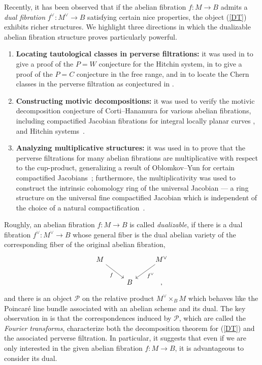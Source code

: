 \documentclass[11pt]{amsart}
\theoremstyle{plain}
\theoremstyle{definition}
\theoremstyle{remark}
\newcommand{\CP}{{\mathcal P}}
\begin{document}
Recently, it has been observed that if the abelian fibration $f: M \to B$ admits a \emph{dual fibration} $f^\vee: M^\vee \to B$ satisfying certain nice properties, the object (\ref{DT}) exhibits richer structures. We highlight three directions in which the dualizable abelian fibration structure proves particularly powerful.

\begin{enumerate}
    \item[(a)] {\bf Locating tautological classes in perverse filtrations:} it was used in \cite{MSY} to give a proof of the $P=W$ conjecture \cite{dCHM} for the Hitchin system, in \cite{MSY, PSSZ} to give a proof of the $P=C$ conjecture \cite{KPS, KLMP} in the free range, and in \cite{Ghosh} to locate the Chern classes in the perverse filtration as conjectured in \cite{BMSY1}.
    \item[(b)] {\bf Constructing motivic decompositions:} it was used to verify the motivic decomposition conjecture of Corti--Hanamura for various abelian fibrations, including compactified Jacobian fibrations for integral locally planar curves \cite{MSY}, and Hitchin systems~\cite{MSY2}.
    \item[(c)] {\bf Analyzing multiplicative structures:} it was used in \cite{MSY} to prove that the perverse filtrations for many abelian fibrations are multiplicative with respect to the cup-product, generalizing a result of Oblomkov--Yun for certain compactified Jacobians~\cite{OY}; furthermore, the multiplicativity was used to construct the intrinsic cohomology ring of the universal Jacobian --- a ring structure on the universal fine compactified Jacobian which is independent of the choice of a natural compactification~\cite{BMSY2}.
\end{enumerate}

Roughly, an abelian fibration $f: M\to B$ is called \emph{dualizable}, if there is a dual fibration $f^\vee: M^\vee \to B$ whose general fiber is the dual abelian variety of the corresponding fiber of the original abelian fibration,
\[
\begin{tikzcd}
M \arrow[dr, "f"'] & & M^\vee \arrow[dl, "f^\vee"] \\
& B &,
\end{tikzcd}
\]
and there is an object $\CP$ on the relative product $M^\vee \times_B M$ which behaves like the Poincar\'e line bundle associated with an abelian scheme and its dual. The key observation in \cite{MSY} is that the correspondences induced by $\CP$, which are called the \emph{Fourier transforms}, characterize both the decomposition theorem for (\ref{DT}) and the associated perverse filtration. In particular, it suggests that even if we are only interested in the given abelian fibration $f: M \to B$, it is advantageous to consider its dual. 
\end{document}
